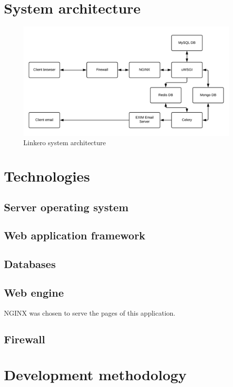 \section{System architecture}

\begin{figure}
\centering
\includegraphics[scale=0.3]{imgs/System Architecture.pdf}
\caption{Linkero system architecture}
\end{figure}

\section{Technologies}

\subsection{Server operating system}

\subsection{Web application framework}

\subsection{Databases}

\subsection{Web engine}
NGINX was chosen to serve the pages of this application.

\subsection{Firewall}

\section{Development methodology}

